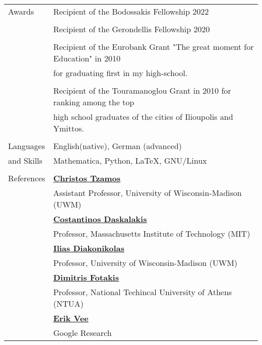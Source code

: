 \documentclass[letterpaper,11pt,oneside]{article}
\begin{document}
\begin{longtable}{@{} l l}
 \Large{Awards}

 & Recipient of the Bodossakis Fellowship 2022 \\
 & \\

 & Recipient of the Gerondellis Fellowship 2020 \\
 & \\

 & Recipient of the Eurobank Grant "The great moment for Education" in 2010\\
 & for graduating first in my high-school. \\
 &\\

 & Recipient of the Touramanoglou Grant in 2010 for ranking among the top \\
 & high school graduates of the cities of Ilioupolis and Ymittos. \\
 &\\

  \Large{Languages}   & English(native), German (advanced) \\
\Large{and Skills}    & Mathematica, Python, \LaTeX, GNU/Linux\\
&\\


 \Large{References}
 & \href{http://www.tzamos.com}{\textbf{Christos Tzamos}} \\
 & Assistant Professor, University of Wisconsin-Madison (UWM) \\
 & \href{https://people.csail.mit.edu/costis/}{\textbf{Costantinos Daskalakis}} \\ 
 & Professor, Massachusetts Institute of Technology (MIT) \\
 & \href{http://www.iliasdiakonikolas.org}{\textbf{Ilias Diakonikolas}} \\
 & Professor, University of Wisconsin-Madison (UWM) \\
 & \href{http://www.fotakis.cs.ntua.gr}{\textbf{Dimitris Fotakis}} \\
 & Professor, National Techincal University of Athens (NTUA) \\
 & \href{https://scholar.google.com/citations?user=1u8drP0AAAAJ&hl=en
}{\textbf{Erik Vee}} \\
 & Google Research \\
\end{longtable}
\end{document}
